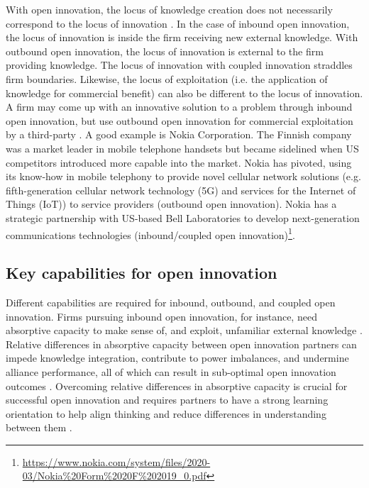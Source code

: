 With open innovation, the locus of knowledge creation does not necessarily correspond to the locus of innovation \citep{gassmann2004towards}. In the case of inbound open innovation, the locus of innovation is inside the firm receiving new external knowledge. With outbound open innovation, the locus of innovation is external to the firm providing knowledge. The locus of innovation with coupled innovation straddles firm boundaries. Likewise, the locus of exploitation (i.e. the application of knowledge for commercial benefit) can also be different to the locus of innovation. A firm may come up with an innovative solution to a problem through inbound open innovation, but use outbound open innovation for commercial exploitation by a third-party \citep{gassmann2004towards}. A good example is Nokia Corporation. The Finnish company was a market leader in mobile telephone handsets but became sidelined when US competitors introduced more capable  into the market. Nokia has pivoted, using its know-how in mobile telephony to provide novel cellular network solutions (e.g. fifth-generation cellular network technology (5G) and services for the Internet of Things (IoT)) to service providers (outbound open innovation). Nokia has a strategic partnership with US-based Bell Laboratories to develop next-generation communications technologies (inbound/coupled open innovation)\footnote{\url{https://www.nokia.com/system/files/2020-03/Nokia\%20Form\%2020F\%202019_0.pdf}}.  
 
\subsection{Key capabilities for open innovation}

Different capabilities are required for inbound, outbound, and coupled open innovation. Firms pursuing inbound open innovation, for instance, need absorptive capacity to make sense of, and exploit, unfamiliar external knowledge  \citep{vanhaverbeke2007connecting}. Relative differences in absorptive capacity between open innovation partners can impede knowledge integration, contribute to power imbalances, and undermine alliance performance, all of which can result in sub-optimal open innovation outcomes \citep{lane1998relative,vanhaverbeke2007connecting,zobel2016benefiting,tell2017managing}. Overcoming relative differences in absorptive capacity is crucial for successful open innovation and requires partners to have a strong learning orientation to help align thinking and reduce differences in understanding between them  \citep{nooteboom2000learning,sun2010examination,de2016knowledge}. \medskip

